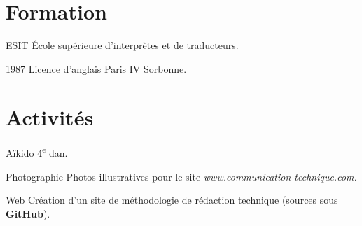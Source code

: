 \documentclass[12pt,a4paper,roman]{moderncv}
\begin{document}
\section{Formation}

        {ESIT}
        {École supérieure d'interprètes et de traducteurs.}
        {}
        {}
        {}

\cventry
    {1987}
    {Licence d'anglais}
    { Paris IV Sorbonne.}
    {}
    {}
    {}


\section{Activités}

\cvitem
    {Aïkido}
    {4\textsuperscript{e} dan.}

\cvitem
    {Photographie}
    {Photos illustratives pour le site
      \emph{www.communication-technique.com.}}

\cvitem
    {Web}
    {Création d'un site de méthodologie de rédaction technique (sources sous
      \textbf{GitHub}).}
\end{document}

